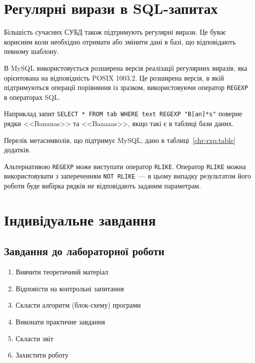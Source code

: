 \pagebreak[3]
\section{Регулярні вирази в SQL-запитах}
\nopagebreak[4]
Більшість сучасних СУБД також підтримують регулярні вирази. Це буває корисним коли необхідно отримати або змінити дані в базі, що відповідають певному шаблону.

В MySQL використовується розширена версія  реалізації регулярних виразів, яка орієнтована на відповідність POSIX 1003.2. Це розширена версія, в якій підтримуються операції порівняння із зразком, використовуючи оператор \verb'REGEXP' в операторах SQL.

Наприклад запит \verb|SELECT * FROM tab WHERE text REGEXP "B[an]*s"| поверне рядки <<Bananas>> та <<Baaaaas>>, якщо такі є в таблиці бази даних.

Перелік метасимволів, що підтримує MySQL, дано в таблиці~\ref{chr-rxp:table} додатків.

Альтернативою \verb'REGEXP' може виступати оператор \verb'RLIKE'. Оператор \verb'RLIKE' можна використовувати з запереченням \verb'NOT RLIKE'~--- в цьому випадку результатом його роботи буде вибірка рядків не відповідають заданим параметрам.
\pagebreak[3]
\section{Індивідуальне завдання}

\nopagebreak[4]
\subsection*{Завдання до лабораторної роботи}
\nopagebreak[4]
\begin{enumerate}
\item Вивчити теоретичний матеріал
\item Відповісти на контрольні запитання
\item Скласти алгоритм (блок-схему) програми
\item Виконати практичне завдання
\item Скласти звіт
\item Захистити роботу
\end{enumerate}

